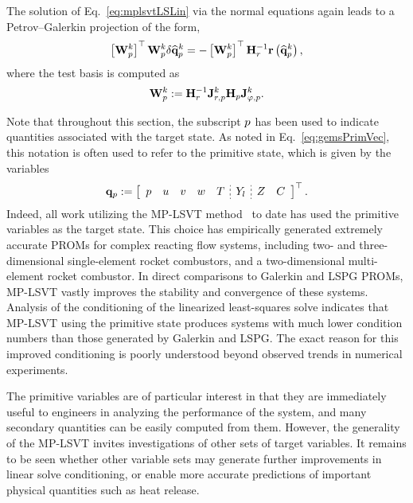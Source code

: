 The solution of Eq.~\ref{eq:mplsvtLSLin} via the normal equations again leads to a Petrov--Galerkin projection of the form,
%
\begin{equation}
    \left[\testBasisPrim^\newtonIdx\right]^\top \testBasisPrim^{\newtonIdx} \delta \primVecCoef^{\newtonIdx} = - \left[\testBasisPrim^{\newtonIdx}\right]^\top \resScaleInv \resFunc{\primVecCoef^{\newtonIdx}},
\end{equation}
%
where the test basis is computed as
%
\begin{equation}
    \testBasisPrim^{\newtonIdx} \defEq \resScaleInv \jacobResPrim^{\newtonIdx} \jacobDecodePrim^{\newtonIdx}.
\end{equation}
%

Note that throughout this section, the subscript $p$ has been used to indicate quantities associated with the target state. As noted in Eq.~\ref{eq:gemsPrimVec}, this notation is often used to refer to the primitive state, which is given by the variables
%
\begin{equation}
    \primVec \defEq \left[
    \begin{array}{ccccc;{2pt/2pt}c;{2pt/2pt}cc}
    \pressure & \velX & \velY & \velZ & \temperature & \mfSpec & \mixFrac & \progVar
    \end{array}
    \right]^\top.
\end{equation}
%
Indeed, all work utilizing the MP-LSVT method~\cite{Huang2022,Wentland2021,Huang2022a} to date has used the primitive variables as the target state. This choice has empirically generated extremely accurate PROMs for complex reacting flow systems, including two- and three-dimensional single-element rocket combustors, and a two-dimensional multi-element rocket combustor. In direct comparisons to Galerkin and LSPG PROMs, MP-LSVT vastly improves the stability and convergence of these systems. Analysis of the conditioning of the linearized least-squares solve indicates that MP-LSVT using the primitive state produces systems with much lower condition numbers than those generated by Galerkin and LSPG. The exact reason for this improved conditioning is poorly understood beyond observed trends in numerical experiments.

The primitive variables are of particular interest in that they are immediately useful to engineers in analyzing the performance of the system, and many secondary quantities can be easily computed from them. However, the generality of the MP-LSVT invites investigations of other sets of target variables. It remains to be seen whether other variable sets may generate further improvements in linear solve conditioning, or enable more accurate predictions of important physical quantities such as heat release.